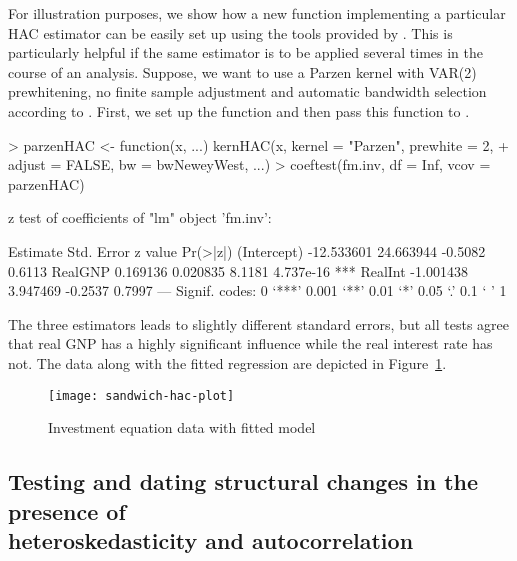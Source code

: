 \documentclass{Z}
\begin{document}
For illustration purposes, we show how a new function implementing a particular
HAC estimator can be easily set up using the tools provided by .
This is particularly helpful if the same estimator is to be applied several times
in the course of an analysis. Suppose, we want to use a Parzen kernel with VAR(2)
prewhitening, no finite sample adjustment and automatic bandwidth selection
according to \cite{hac:Newey+West:1994}. First, we set
up the function  and then pass this function to . 
\begin{Schunk}
\begin{Sinput}
> parzenHAC <- function(x, ...) kernHAC(x, kernel = "Parzen", prewhite = 2, 
+     adjust = FALSE, bw = bwNeweyWest, ...)
> coeftest(fm.inv, df = Inf, vcov = parzenHAC)
\end{Sinput}
\begin{Soutput}
z test of coefficients of "lm" object 'fm.inv':

              Estimate Std. Error z value  Pr(>|z|)    
(Intercept) -12.533601  24.663944 -0.5082    0.6113    
RealGNP       0.169136   0.020835  8.1181 4.737e-16 ***
RealInt      -1.001438   3.947469 -0.2537    0.7997    
---
Signif. codes:  0 `***' 0.001 `**' 0.01 `*' 0.05 `.' 0.1 ` ' 1 
\end{Soutput}
\end{Schunk}
The three estimators leads to slightly different standard errors, but all
tests agree that real GNP has a highly significant influence while
the real interest rate has not. The data along with the fitted regression
are depicted in Figure~\ref{fig:hac}.

\begin{figure}[tbh]
\begin{center}
\texttt{[image: sandwich-hac-plot]}
\caption{\label{fig:hac} Investment equation data with fitted model}
\end{center}
\end{figure}

\subsection[Testing and dating structural changes in the presence of heteroskedasticity and autocorrelation]{Testing and dating structural changes in the presence of\\ heteroskedasticity and autocorrelation}
\end{document}
